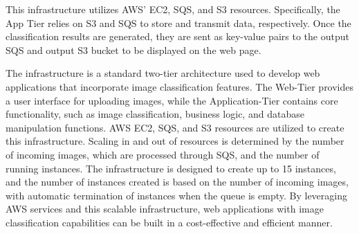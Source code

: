 \documentclass[../main.tex]{subfiles}
\begin{document}
This infrastructure utilizes AWS' EC2, SQS, and S3 resources. Specifically, the App Tier relies on S3 and SQS to store and transmit data, respectively. Once the classification results are generated, they are sent as key-value pairs to the output SQS and output S3 bucket to be displayed on the web page.

The infrastructure is a standard two-tier architecture used to develop web applications that incorporate image classification features. The Web-Tier provides a user interface for uploading images, while the Application-Tier contains core functionality, such as image classification, business logic, and database manipulation functions. AWS EC2, SQS, and S3 resources are utilized to create this infrastructure. Scaling in and out of resources is determined by the number of incoming images, which are processed through SQS, and the number of running instances. The infrastructure is designed to create up to 15 instances, and the number of instances created is based on the number of incoming images, with automatic termination of instances when the queue is empty. By leveraging AWS services and this scalable infrastructure, web applications with image classification capabilities can be built in a cost-effective and efficient manner.
\end{document}
